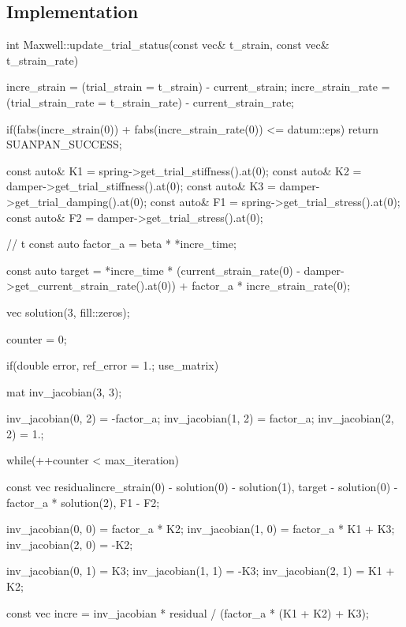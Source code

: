 \subsection{Implementation}
\begin{cppcode}
int Maxwell::update_trial_status(const vec& t_strain, const vec& t_strain_rate) {
    incre_strain = (trial_strain = t_strain) - current_strain;
    incre_strain_rate = (trial_strain_rate = t_strain_rate) - current_strain_rate;

    if(fabs(incre_strain(0)) + fabs(incre_strain_rate(0)) <= datum::eps) return SUANPAN_SUCCESS;

    const auto& K1 = spring->get_trial_stiffness().at(0);
    const auto& K2 = damper->get_trial_stiffness().at(0);
    const auto& K3 = damper->get_trial_damping().at(0);
    const auto& F1 = spring->get_trial_stress().at(0);
    const auto& F2 = damper->get_trial_stress().at(0);

    // \beta\Delta{}t
    const auto factor_a = beta * *incre_time;

    const auto target = *incre_time * (current_strain_rate(0) - damper->get_current_strain_rate().at(0)) + factor_a * incre_strain_rate(0);

    vec solution(3, fill::zeros);

    counter = 0;

    if(double error, ref_error = 1.; use_matrix) {
        mat inv_jacobian(3, 3);

        inv_jacobian(0, 2) = -factor_a;
        inv_jacobian(1, 2) = factor_a;
        inv_jacobian(2, 2) = 1.;

        while(++counter < max_iteration) {
            const vec residual{incre_strain(0) - solution(0) - solution(1), target - solution(0) - factor_a * solution(2), F1 - F2};

            inv_jacobian(0, 0) = factor_a * K2;
            inv_jacobian(1, 0) = factor_a * K1 + K3;
            inv_jacobian(2, 0) = -K2;

            inv_jacobian(0, 1) = K3;
            inv_jacobian(1, 1) = -K3;
            inv_jacobian(2, 1) = K1 + K2;

            const vec incre = inv_jacobian * residual / (factor_a * (K1 + K2) + K3);

}}}
\end{cppcode}
